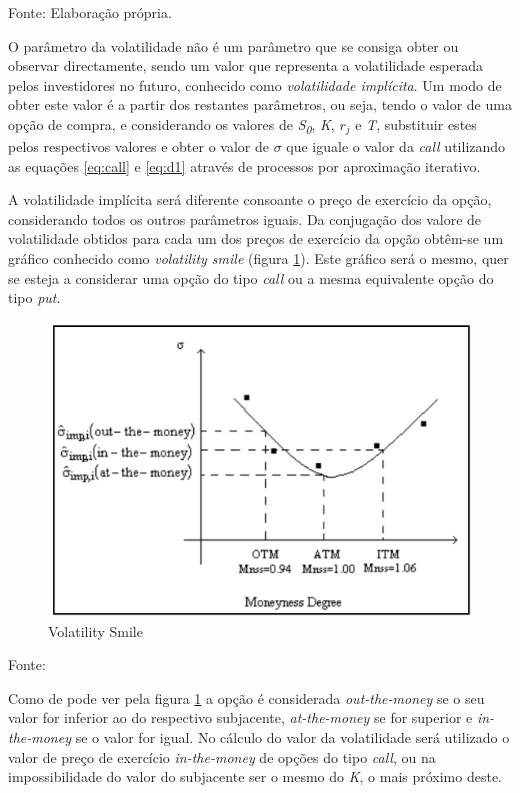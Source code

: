 \documentclass[
  12pt,
  a4paper,
  openany]{book}
\theoremstyle{definition}
\theoremstyle{definition}
\theoremstyle{definition}
\theoremstyle{remark}
\begin{document}
Fonte: Elaboração própria.

\justifying
\bigskip

O parâmetro da volatilidade não é um parâmetro que se consiga obter ou observar directamente, sendo um valor que representa a volatilidade esperada pelos investidores no futuro, conhecido como \emph{volatilidade implícita}. Um modo de obter este valor é a partir dos restantes parâmetros, ou seja, tendo o valor de uma opção de compra, e considerando os valores de \emph{S\textsubscript{0}}, \emph{K}, \emph{\(r_j\)} e \emph{T}, substituir estes pelos respectivos valores e obter o valor de \(\sigma\) que iguale o valor da \emph{call} utilizando as equações \eqref{eq:call} e \eqref{eq:d1} através de processos por aproximação iterativo.

A volatilidade implícita será diferente consoante o preço de exercício da opção, considerando todos os outros parâmetros iguais. Da conjugação dos valore de volatilidade obtidos para cada um dos preços de exercício da opção obtêm-se um gráfico conhecido como \emph{volatility smile} (figura \ref{fig:volatilitysmile}). Este gráfico será o mesmo, quer se esteja a considerar uma opção do tipo \emph{call} ou a mesma equivalente opção do tipo \emph{put}.

\begin{figure}

{\centering \includegraphics[width=0.6\linewidth]{image/volatilitysmile} 

}

\caption{Volatility Smile}\label{fig:volatilitysmile}
\end{figure}
\FloatBarrier
\centering

Fonte: \citep[pp.182]{volatilitysmile}

\justifying
\bigskip

Como de pode ver pela figura \ref{fig:volatilitysmile} a opção é considerada \emph{out-the-money} se o seu valor for inferior ao do respectivo subjacente, \emph{at-the-money} se for superior e \emph{in-the-money} se o valor for igual. No cálculo do valor da volatilidade será utilizado o valor de preço de exercício \emph{in-the-money} de opções do tipo \emph{call}, ou na impossibilidade do valor do subjacente ser o mesmo do \emph{K}, o mais próximo deste.
\end{document}
